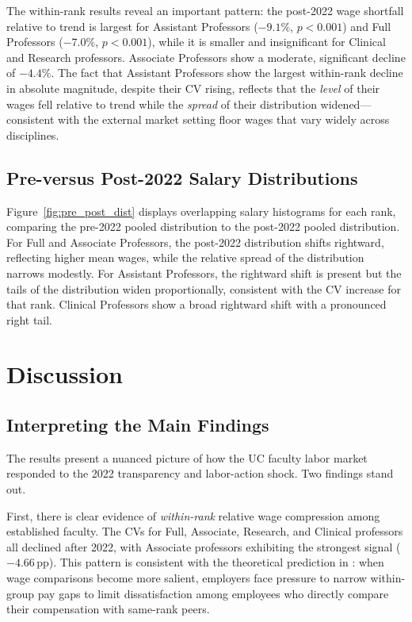 \documentclass[12pt]{article}
\begin{document}
The within-rank results reveal an important pattern: the post-2022
wage shortfall relative to trend is largest for Assistant Professors
($-9.1\%$, $p < 0.001$) and Full Professors ($-7.0\%$, $p < 0.001$),
while it is smaller and insignificant for Clinical and Research
professors. Associate Professors show a moderate, significant decline of
$-4.4\%$. The fact that Assistant Professors show the largest
within-rank decline in absolute magnitude, despite their CV rising,
reflects that the \emph{level} of their wages fell relative to trend
while the \emph{spread} of their distribution widened---consistent with
the external market setting floor wages that vary widely across
disciplines.

\subsection{Pre-versus Post-2022 Salary Distributions}
\label{subsec:distributions}

Figure~\ref{fig:pre_post_dist} displays overlapping salary histograms for
each rank, comparing the pre-2022 pooled distribution to the post-2022
pooled distribution. For Full and Associate Professors, the post-2022
distribution shifts rightward, reflecting higher mean wages, while the
relative spread of the distribution narrows modestly. For Assistant
Professors, the rightward shift is present but the tails of the
distribution widen proportionally, consistent with the CV increase for
that rank. Clinical Professors show a broad rightward shift with a
pronounced right tail.

\section{Discussion}
\label{sec:discussion}

\subsection{Interpreting the Main Findings}

The results present a nuanced picture of how the UC faculty labor market
responded to the 2022 transparency and labor-action shock. Two findings
stand out.

First, there is clear evidence of \emph{within-rank} relative wage
compression among established faculty. The CVs for Full, Associate,
Research, and Clinical professors all declined after 2022, with Associate
professors exhibiting the strongest signal ($-4.66$\,pp). This pattern
is consistent with the theoretical prediction in \citet{cullen2022}: when
wage comparisons become more salient, employers face pressure to narrow
within-group pay gaps to limit dissatisfaction among employees who
directly compare their compensation with same-rank peers.
\end{document}
